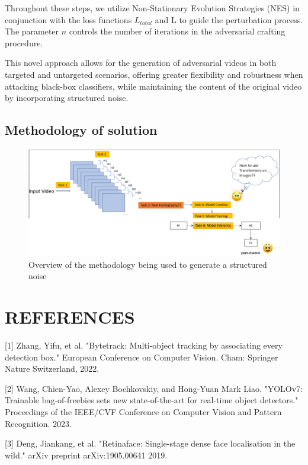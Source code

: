 Throughout these steps, we utilize Non-Stationary Evolution Strategies (NES) in conjunction with the loss functions $L_{total}$ and L to guide the perturbation process. The parameter $n$ controls the number of iterations in the adversarial crafting procedure.

This novel approach allows for the generation of adversarial videos in both targeted and untargeted scenarios, offering greater flexibility and robustness when attacking black-box classifiers, while maintaining the content of the original video by incorporating structured noise.

\subsection{Methodology of solution}
\begin{figure}[!hbt]
    \centering
    \includegraphics[scale=0.4]{img/novel.drawio.png}
    \caption{Overview of the methodology being used to generate a structured noise}
    \label{fig:Figure6}
\end{figure}

\section{REFERENCES}

[1] Zhang, Yifu, et al. "Bytetrack: Multi-object tracking by associating every detection box." European Conference on Computer Vision. Cham: Springer Nature Switzerland, 2022.

[2] Wang, Chien-Yao, Alexey Bochkovskiy, and Hong-Yuan Mark Liao. "YOLOv7: Trainable bag-of-freebies sets new state-of-the-art for real-time object detectors." Proceedings of the IEEE/CVF Conference on Computer Vision and Pattern Recognition. 2023.

[3] Deng, Jiankang, et al. "Retinaface: Single-stage dense face localisation in the wild." arXiv preprint arXiv:1905.00641 2019.

